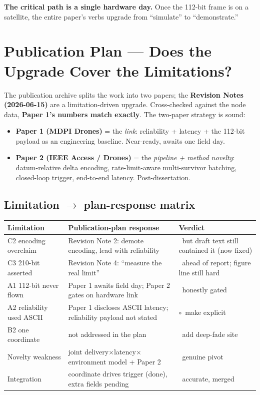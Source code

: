\documentclass[11pt,a4paper]{article}
\newcommand{\yes}{\textcolor{good}{\ding{51}}}
\newcommand{\no}{\textcolor{warn}{\ding{55}}}
\newcommand{\partialmark}{\textcolor{accent}{$\circ$}}
\begin{document}
\textbf{The critical path is a single hardware day.} Once the 112-bit frame is on a
satellite, the entire paper's verbs upgrade from ``simulate'' to ``demonstrate.''

\section{Publication Plan --- Does the Upgrade Cover the Limitations?}

The publication archive splits the work into two papers; the \textbf{Revision Notes
(2026-06-15)} are a limitation-driven upgrade. Cross-checked against the node data,
\textbf{Paper 1's numbers match exactly}. The two-paper strategy is sound:
\begin{itemize}[leftmargin=1.4em,itemsep=1pt]
  \item \textbf{Paper 1 (MDPI Drones)} = the \emph{link}: reliability + latency + the
        112-bit payload as an engineering baseline. Near-ready, awaits one field day.
  \item \textbf{Paper 2 (IEEE Access / Drones)} = the \emph{pipeline + method novelty}:
        datum-relative delta encoding, rate-limit-aware multi-survivor batching, closed-loop
        trigger, end-to-end latency. Post-dissertation.
\end{itemize}

\subsection{Limitation $\to$ plan-response matrix}
\begin{longtable}{@{}p{3.6cm} p{6.0cm} p{3.6cm}@{}}
\toprule
\textbf{Limitation} & \textbf{Publication-plan response} & \textbf{Verdict} \\
\midrule
\endhead
C2 encoding overclaim & Revision Note 2: demote encoding, lead with reliability & \yes\ but draft text still contained it (now fixed) \\
C3 210-bit asserted & Revision Note 4: ``measure the real limit'' & \yes\ ahead of report; figure line still hard \\
A1 112-bit never flown & Paper 1 awaits field day; Paper 2 gates on hardware link & \yes\ honestly gated \\
A2 reliability used ASCII & Paper 1 discloses ASCII latency; reliability payload not stated & \partialmark\ make explicit \\
B2 one coordinate & not addressed in the plan & \no\ add deep-fade site \\
Novelty weakness & joint delivery$\times$latency$\times$environment model + Paper 2 & \yes\ genuine pivot \\
Integration & coordinate drives trigger (done), extra fields pending & \yes\ accurate, merged \\
\bottomrule
\end{longtable}
\end{document}
